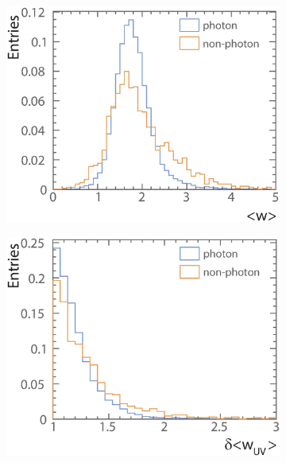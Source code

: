 \begin{figure}[tbph]
\begin{subfigure}[b]{0.45\textwidth}
    \includegraphics[width=\textwidth]{photon/likelihood/PeakRms2}
    \caption{}
    \label{fig:photonPeakRms}
  \end{subfigure}
  \begin{subfigure}[b]{0.45\textwidth}
    \includegraphics[width=\textwidth]{photon/likelihood/RmsRatio2}
    \caption{}
    \label{fig:photonMinDistanceToTrack}
  \end{subfigure}
    \begin{subfigure}[b]{0.45\textwidth}

\end{subfigure}
\end{figure}
